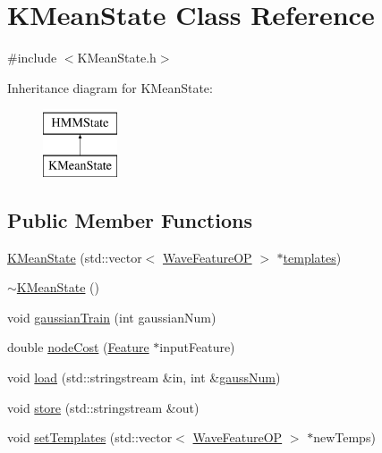 \hypertarget{class_k_mean_state}{\section{K\+Mean\+State Class Reference}
\label{class_k_mean_state}
}


{\ttfamily \#include $<$K\+Mean\+State.\+h$>$}

Inheritance diagram for K\+Mean\+State\+:\begin{figure}[H]
\begin{center}
\leavevmode
\includegraphics[height=2.000000cm]{class_k_mean_state}
\end{center}
\end{figure}
\subsection*{Public Member Functions}
\begin{DoxyCompactItemize}
\item 
\hyperlink{class_k_mean_state_a514a6b2326e2236e63edf3087a6e21dd}{K\+Mean\+State} (std\+::vector$<$ \hyperlink{class_wave_feature_o_p}{Wave\+Feature\+O\+P} $>$ $\ast$\hyperlink{class_h_m_m_state_a04d0b1a1570a339e5cd0db13aeb0d2ae}{templates})
\item 
\hyperlink{class_k_mean_state_a0889842e49b26726cb31942de9751de2}{$\sim$\+K\+Mean\+State} ()
\item 
void \hyperlink{class_k_mean_state_a5a6269056f80bfbce8d1598c729877fa}{gaussian\+Train} (int gaussian\+Num)
\item 
double \hyperlink{class_k_mean_state_a6f628235aea39397ff91d0b6509ef927}{node\+Cost} (\hyperlink{class_feature}{Feature} $\ast$input\+Feature)
\item 
void \hyperlink{class_k_mean_state_aa84a9c40d629924d92a6816f45623f36}{load} (std\+::stringstream \&in, int \&\hyperlink{pro6__demo_8cpp_a923ffcfa3c56ccdba17bc4e700247d54}{gauss\+Num})
\item 
void \hyperlink{class_k_mean_state_afaa85c369000eca4930c478809bbc54b}{store} (std\+::stringstream \&out)
\item 
void \hyperlink{class_k_mean_state_ac3a33185bbab17390b55a85ec6e270e5}{set\+Templates} (std\+::vector$<$ \hyperlink{class_wave_feature_o_p}{Wave\+Feature\+O\+P} $>$ $\ast$new\+Temps)
\end{DoxyCompactItemize}
